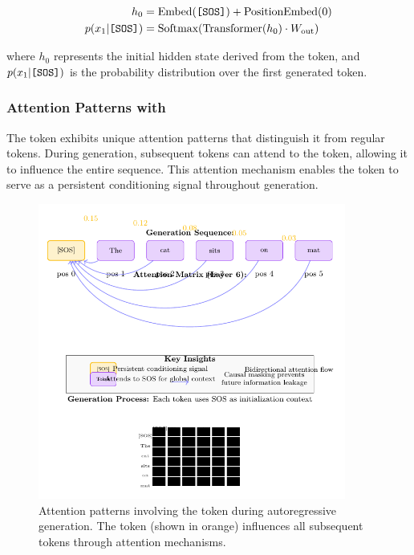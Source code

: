\begin{align}
h_0 &= \text{Embed}(\text{\texttt{[SOS]}{}}) + \text{PositionEmbed}(0) \\
p(x_1 | \text{\texttt{[SOS]}{}}) &= \text{Softmax}(\text{Transformer}(h_0) \cdot W_{\text{out}})
\end{align}

where $h_0$ represents the initial hidden state derived from the \sos{} token, and $p(x_1 | \text{\texttt{[SOS]}{}})$ is the probability distribution over the first generated token.

\subsubsection{Attention Patterns with \sos{}}

The \sos{} token exhibits unique attention patterns that distinguish it from regular tokens. During generation, subsequent tokens can attend to the \sos{} token, allowing it to influence the entire sequence. This attention mechanism enables the \sos{} token to serve as a persistent conditioning signal throughout generation.

\begin{figure}[htbp]
\centering
\includegraphics[width=0.9\textwidth]{part1/chapter03/fig_sos_attention.pdf}
\caption{Attention patterns involving the \sos{} token during autoregressive generation. The \sos{} token (shown in orange) influences all subsequent tokens through attention mechanisms.}
\label{fig:sos_attention}
\end{figure}

